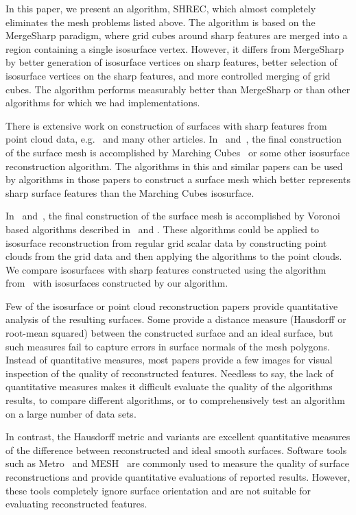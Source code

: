 In this paper, we present an algorithm, SHREC,
which almost completely eliminates the mesh problems listed above.
The algorithm is based on the MergeSharp paradigm,
where grid cubes around sharp features are merged
into a region containing a single isosurface vertex.
However, it differs from MergeSharp by better generation
of isosurface vertices on sharp features,
better selection of isosurface vertices on the sharp features,
and more controlled merging of grid cubes.
The algorithm performs measurably better
than MergeSharp or than other algorithms for which we had implementations.

There is extensive work on construction of surfaces with sharp features 
from point cloud data,
e.g.~\cite{avron2010L,cdr-drpsc-07,Daniels:2007:Robust,Dey2012,
fcs-rmlsf-2005,Oztireli2009,sym-fpmg-10,Wang:2013:Feature}
and many other articles.
In~\cite{Oztireli2009} and~\cite{Wang:2013:Feature},
the final construction of the surface mesh is accomplished 
by Marching Cubes~\cite{lc-mchr3-87}
or some other isosurface reconstruction algorithm.
The algorithms in this and similar papers
can be used by algorithms in those papers
to construct a surface mesh which better represents sharp surface features
than the Marching Cubes isosurface.

In~\cite{cdr-drpsc-07,Dey2012} and~\cite{sym-fpmg-10},
the final construction of the surface mesh is accomplished
by Voronoi based algorithms described 
in~\cite{cdr-drpsc-07} and \cite{Dey2012}.
These algorithms could be applied to isosurface reconstruction
from regular grid scalar data
by constructing point clouds from the grid data
and then applying the algorithms to the point clouds.
We compare isosurfaces with sharp features constructed
using the algorithm from~\cite{Dey2012}
with isosurfaces constructed by our algorithm.

Few of the isosurface or point cloud reconstruction papers
provide quantitative analysis of the resulting surfaces.
Some provide a distance measure (Hausdorff or root-mean squared)
between the constructed surface and an ideal surface,
but such measures fail to capture errors in surface normals
of the mesh polygons.
Instead of quantitative measures,
most papers provide a few images for visual inspection
of the quality of reconstructed features.
Needless to say, the lack of quantitative measures makes it
difficult evaluate the quality of the algorithms results,
to compare different algorithms,
or to comprehensively test an algorithm on a large number of data sets.

In contrast, the Hausdorff metric and variants are excellent
quantitative measures of the difference between reconstructed
and ideal smooth surfaces.
Software tools such as Metro~\cite{Cignoni:1998:metro} 
and MESH~\cite{Aspert:2002:MESH} are commonly used to measure
the quality of surface reconstructions
and provide quantitative evaluations of reported results.
However, these tools completely ignore surface orientation
and are not suitable for evaluating reconstructed features.

